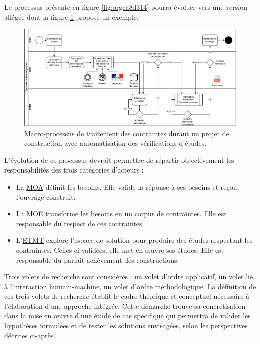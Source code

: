 \documentclass[a4paper,12pt]{article}
\begin{document}
Le processus présenté en figure \ref{fig:orgca8d314} pourra évoluer vers une version allégée dont la figure \ref{fig:org1c0afab} propose un exemple.

\begin{figure}[htbp]
\centering
\includegraphics[width=.9\linewidth]{../svg/BPMN-LifeCycle-Exigences-target.pdf}
\caption{\label{fig:org1c0afab}Macro-processus de traitement des contraintes durant un projet de construction avec automatisation des vérifications d’études.}
\end{figure}

L’évolution de ce processus devrait permettre de répartir objectivement les responsabilités des trois catégories d’acteurs : 
\begin{itemize}
\item La \protect\hyperlink{gls-8}{\label{gls-8-use-2}MOA} définit les besoins. Elle valide la réponse à ses besoins et reçoit l’ouvrage construit.
\item La \protect\hyperlink{gls-9}{\label{gls-9-use-2}MOE} transforme les besoins en un corpus de contraintes. Elle est responsable du respect de ces contraintes.
\item L’\protect\hyperlink{gls-10}{\label{gls-10-use-2}ETMT} explore l’espace de solution pour produire des études respectant les contraintes. Celles-ci validées, elle met en œuvre ses études. Elle est responsable du parfait achèvement des constructions.
\end{itemize}

Trois volets de recherche sont considérés : un volet d’ordre applicatif, un volet lié à l'interaction humain-machine, un volet d’ordre méthodologique. La définition de ces trois volets de recherche établit le cadre théorique et conceptuel nécessaire à l'élaboration d'une approche intégrée. Cette démarche trouve sa concrétisation dans la mise en œuvre d'une étude de cas spécifique qui permettra de valider les hypothèses formulées et de tester les solutions envisagées, selon les perspectives décrites ci-après.
\end{document}
